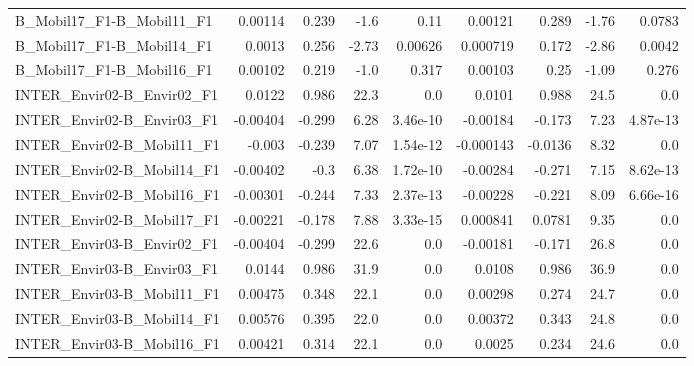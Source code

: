 \begin{tabular}{lrrrrrrrr}
B\_Mobil17\_F1-B\_Mobil11\_F1                 &     0.00114 &        0.239 &    -1.6 &     0.11 &    0.00121 &       0.289 &        -1.76 &        0.0783 \\
B\_Mobil17\_F1-B\_Mobil14\_F1                 &      0.0013 &        0.256 &   -2.73 &  0.00626 &   0.000719 &       0.172 &        -2.86 &        0.0042 \\
B\_Mobil17\_F1-B\_Mobil16\_F1                 &     0.00102 &        0.219 &    -1.0 &    0.317 &    0.00103 &        0.25 &        -1.09 &         0.276 \\
INTER\_Envir02-B\_Envir02\_F1                &      0.0122 &        0.986 &    22.3 &      0.0 &     0.0101 &       0.988 &         24.5 &           0.0 \\
INTER\_Envir02-B\_Envir03\_F1                &    -0.00404 &       -0.299 &    6.28 & 3.46e-10 &   -0.00184 &      -0.173 &         7.23 &      4.87e-13 \\
INTER\_Envir02-B\_Mobil11\_F1                &      -0.003 &       -0.239 &    7.07 & 1.54e-12 &  -0.000143 &     -0.0136 &         8.32 &           0.0 \\
INTER\_Envir02-B\_Mobil14\_F1                &    -0.00402 &         -0.3 &    6.38 & 1.72e-10 &   -0.00284 &      -0.271 &         7.15 &      8.62e-13 \\
INTER\_Envir02-B\_Mobil16\_F1                &    -0.00301 &       -0.244 &    7.33 & 2.37e-13 &   -0.00228 &      -0.221 &         8.09 &      6.66e-16 \\
INTER\_Envir02-B\_Mobil17\_F1                &    -0.00221 &       -0.178 &    7.88 & 3.33e-15 &   0.000841 &      0.0781 &         9.35 &           0.0 \\
INTER\_Envir03-B\_Envir02\_F1                &    -0.00404 &       -0.299 &    22.6 &      0.0 &   -0.00181 &      -0.171 &         26.8 &           0.0 \\
INTER\_Envir03-B\_Envir03\_F1                &      0.0144 &        0.986 &    31.9 &      0.0 &     0.0108 &       0.986 &         36.9 &           0.0 \\
INTER\_Envir03-B\_Mobil11\_F1                &     0.00475 &        0.348 &    22.1 &      0.0 &    0.00298 &       0.274 &         24.7 &           0.0 \\
INTER\_Envir03-B\_Mobil14\_F1                &     0.00576 &        0.395 &    22.0 &      0.0 &    0.00372 &       0.343 &         24.8 &           0.0 \\
INTER\_Envir03-B\_Mobil16\_F1                &     0.00421 &        0.314 &    22.1 &      0.0 &     0.0025 &       0.234 &         24.6 &           0.0 \\

\end{tabular}
